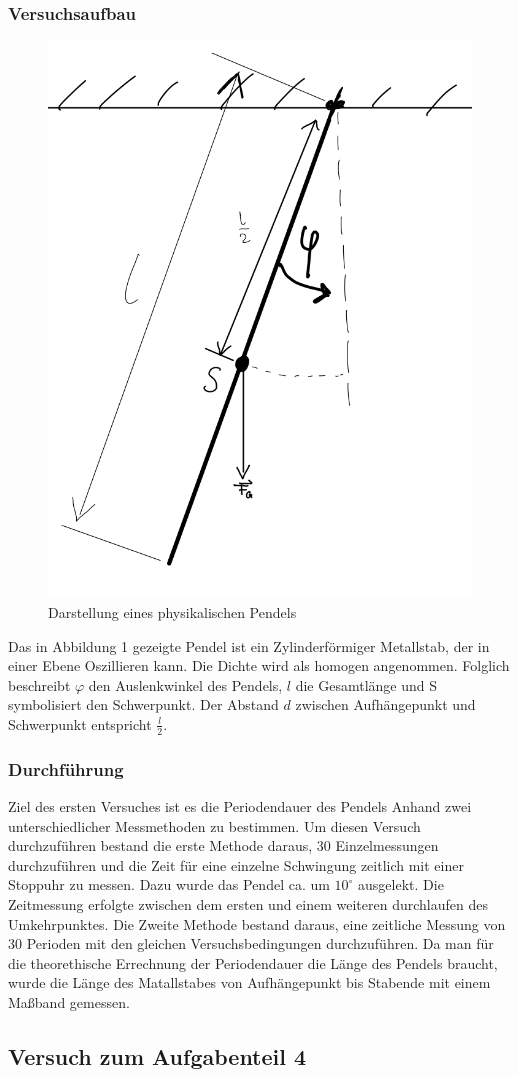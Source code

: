 \documentclass[11pt,a4paper]{article}
\begin{document}
      \subsubsection{Versuchsaufbau}
      \begin{figure}[h]
      	\includegraphics[width=0.4\linewidth]{physikalisches Pendel.png}
      	\centering
      	\caption{Darstellung eines physikalischen Pendels}
      \end{figure}
Das in Abbildung 1 gezeigte Pendel  ist ein Zylinderförmiger Metallstab, der in einer Ebene Oszillieren kann. Die Dichte wird als homogen angenommen. Folglich beschreibt $\varphi$  den Auslenkwinkel des Pendels, $l$ die Gesamtlänge und S symbolisiert den Schwerpunkt. Der Abstand $d$ zwischen Aufhängepunkt und Schwerpunkt entspricht $\frac{l}{2}$.
      \subsubsection{Durchführung}

Ziel des ersten Versuches ist es die Periodendauer des Pendels Anhand zwei unterschiedlicher Messmethoden zu bestimmen. Um diesen Versuch durchzuführen bestand die erste Methode daraus, 30 Einzelmessungen durchzuführen und die Zeit für eine einzelne Schwingung zeitlich mit einer Stoppuhr zu messen. Dazu wurde das Pendel ca. um $10^\circ$ ausgelekt.
 Die Zeitmessung erfolgte zwischen dem ersten und einem weiteren durchlaufen des Umkehrpunktes.
 Die Zweite Methode bestand daraus, eine zeitliche Messung von 30 Perioden mit den gleichen Versuchsbedingungen durchzuführen. 
 Da man für die theorethische Errechnung der Periodendauer die Länge des Pendels braucht, wurde die Länge des Matallstabes von Aufhängepunkt bis Stabende mit einem Maßband gemessen.

\subsection{Versuch zum Aufgabenteil 4}
\end{document}
